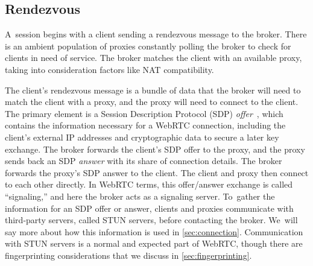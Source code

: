 \documentclass[letterpaper,twocolumn]{article}
\newcommand{\firstterm}[1]{\textit{#1}}
\begin{document}
\subsection{Rendezvous}
\label{sec:rendezvous}

A~session begins with a client sending a rendezvous message to the broker.
There is an ambient population of proxies
constantly polling the broker to check for clients in need of service.
The broker matches the client with an available proxy,
taking into consideration factors like NAT compatibility.

The client's rendezvous message
is a bundle of data that the broker will need to match the client with a proxy,
and the proxy will need to connect to the client.
The primary element is a
Session Description Protocol (SDP) \firstterm{offer}~\cite{rfc8839},
which contains the information necessary for a WebRTC connection,
including the client's external IP addresses
and cryptographic data to secure a later key exchange.
The broker forwards the client's SDP offer to the proxy,
and the proxy sends back an SDP \firstterm{answer}
with its share of connection details.
The broker forwards the proxy's SDP answer to the client.
The client and proxy then connect to each other directly.
In WebRTC terms, this offer/\allowbreak answer exchange is called
``signaling,'' and here the broker acts as a signaling server.
To~gather the information for an SDP offer or answer,
clients and proxies communicate with third-party servers,
called STUN servers,
before contacting the broker.
We~will say more about how this information is used in \autoref{sec:connection}.
Communication with STUN servers is a normal and expected part of WebRTC,
though there are fingerprinting considerations
that we discuss in \autoref{sec:fingerprinting}.
\end{document}
